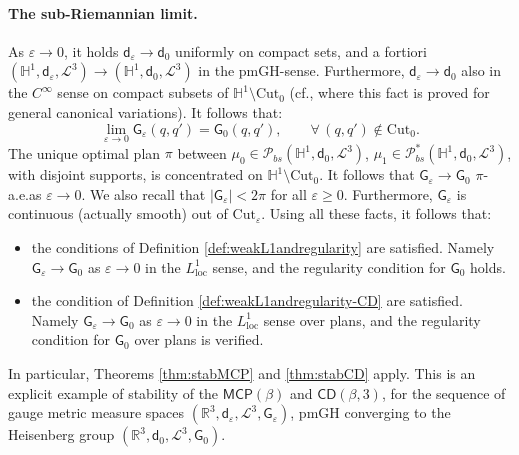 \documentclass[11pt,a4paper]{article}
\theoremstyle{plain}
\theoremstyle{definition}
\theoremstyle{remark}
\numberwithin{equation}{section}
\renewcommand{\H}{\mathbb{H}}
\newcommand{\Cut}{\mathrm{Cut}}
\newcommand{\CD}{\mathsf{CD}}
\newcommand{\MCP}{\mathsf{MCP}}
\newcommand{\loc}{\mathrm{loc}}
\newcommand{\Prob}{\mathcal{P}}
\newcommand{\sfd}{\mathsf d}
\newcommand{\sfG}{\mathsf G}
\begin{document}
\paragraph{The sub-Riemannian limit.}  As $\varepsilon\to 0$, it holds $\sfd_\varepsilon \to \sfd_0$ uniformly on compact sets, and a fortiori $(\H^1,\sfd_\varepsilon,\mathscr{L}^3)\to(\H^1,\sfd_0,\mathscr{L}^3)$ in the pmGH-sense. Furthermore, $\sfd_\varepsilon \to \sfd_0$ also in the $C^\infty$ sense on compact subsets of $\H^1 \setminus \Cut_0$ (cf.\@ \cite[Prop.\@ 2.8]{BGMR-Htype}, where this fact is proved for general canonical variations). It follows that:
\begin{equation}
\lim_{\varepsilon\to 0} \sfG_\varepsilon(q,q') = \sfG_0(q,q'),\qquad \forall\, (q,q')\notin \Cut_0.
\end{equation}
The unique optimal plan $\pi$ between $\mu_0\in \Prob_{bs}(\H^1,\sfd_0,\mathscr{L}^3)$, $\mu_1 \in \Prob_{bs}^{*} (\H^1,\sfd_0,\mathscr{L}^3)$, with disjoint supports, is concentrated on $\H^1\setminus\Cut_0$. It follows that $\sfG_\varepsilon \to \sfG_0$ $\pi$-a.e.\@ as $\varepsilon\to 0$. We also recall that $|\sfG_\varepsilon|<2\pi$ for all $\varepsilon\geq 0$. Furthermore, $\sfG_\varepsilon$ is continuous (actually smooth) out of $\Cut_\varepsilon$. Using all these facts, it follows that:	
\begin{itemize}
\item the conditions of Definition \ref{def:weakL1andregularity} are satisfied. Namely $\sfG_\varepsilon \to \sfG_0$ as $\varepsilon\to 0$ in the $L^1_{\loc}$ sense, and the regularity condition for $\sfG_0$ holds.
\item the condition of Definition \ref{def:weakL1andregularity-CD} are satisfied. Namely $\sfG_\varepsilon\to \sfG_0$ as $\varepsilon\to 0$ in the $L^1_{\loc}$ sense over plans, and the regularity condition for $\sfG_0$ over plans is verified.
\end{itemize}
In particular, Theorems \ref{thm:stabMCP} and \ref{thm:stabCD} apply. This is an explicit example of stability of the $\MCP(\beta)$ and $\CD(\beta,3)$, for the sequence of gauge metric measure spaces $(\mathbb{R}^3,\sfd_\varepsilon,\mathscr{L}^3,\sfG_\varepsilon)$, pmGH converging to the Heisenberg group $(\mathbb{R}^3,\sfd_0,\mathscr{L}^3,\sfG_0)$.
\end{document}
